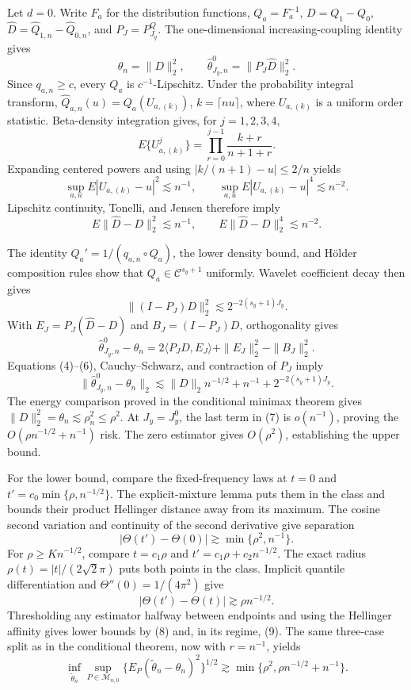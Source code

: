 Let \(d=0\).  Write \(F_a\) for the distribution functions, \(Q_a=F_a^{-1}\), \(D=Q_1-Q_0\), \(\widehat D=\widehat Q_{1,n}-\widehat Q_{0,n}\), and \(P_J=P^Q_{J_y}\).  The one-dimensional increasing-coupling identity gives
\[
\theta_n=\|D\|_2^2,
\qquad
\widehat\theta^0_{J_y,n}=\|P_J\widehat D\|_2^2. \tag{1}
\]
Since \(q_{a,n}\ge c\), every \(Q_a\) is \(c^{-1}\)-Lipschitz.  Under the probability integral transform, \(\widehat Q_{a,n}(u)=Q_a(U_{a,(k)})\), \(k=\lceil nu\rceil\), where \(U_{a,(k)}\) is a uniform order statistic.  Beta-density integration gives, for \(j=1,2,3,4\),
\[
E\{U_{a,(k)}^j\}=\prod_{r=0}^{j-1}\frac{k+r}{n+1+r}. \tag{2}
\]
Expanding centered powers and using \(|k/(n+1)-u|\le2/n\) yields
\[
\sup_{a,u}E|U_{a,(k)}-u|^2\lesssim n^{-1},
\qquad
\sup_{a,u}E|U_{a,(k)}-u|^4\lesssim n^{-2}. \tag{3}
\]
Lipschitz continuity, Tonelli, and Jensen therefore imply
\[
E\|\widehat D-D\|_2^2\lesssim n^{-1},
\qquad E\|\widehat D-D\|_2^4\lesssim n^{-2}. \tag{4}
\]

The identity \(Q_a'=1/(q_{a,n}\circ Q_a)\), the lower density bound, and H\"older composition rules show that \(Q_a\in\mathcal C^{s_y+1}\) uniformly.  Wavelet coefficient decay then gives
\[
\|(I-P_J)D\|_2^2\lesssim2^{-2(s_y+1)J_y}. \tag{5}
\]
With \(E_J=P_J(\widehat D-D)\) and \(B_J=(I-P_J)D\), orthogonality gives
\[
\widehat\theta^0_{J_y,n}-\theta_n
=2\langle P_JD,E_J\rangle+\|E_J\|_2^2-\|B_J\|_2^2. \tag{6}
\]
Equations (4)--(6), Cauchy--Schwarz, and contraction of \(P_J\) imply
\[
\|\widehat\theta^0_{J_y,n}-\theta_n\|_2
\lesssim\|D\|_2n^{-1/2}+n^{-1}+2^{-2(s_y+1)J_y}. \tag{7}
\]
The energy comparison proved in the conditional minimax theorem gives \(\|D\|_2^2=\theta_n\lesssim\rho_n^2\le\rho^2\).  At \(J_y=J_y^0\), the last term in (7) is \(o(n^{-1})\), proving the \(O(\rho n^{-1/2}+n^{-1})\) risk.  The zero estimator gives \(O(\rho^2)\), establishing the upper bound.

For the lower bound, compare the fixed-frequency laws at \(t=0\) and \(t'=c_0\min\{\rho,n^{-1/2}\}\).  The explicit-mixture lemma puts them in the class and bounds their product Hellinger distance away from its maximum.  The cosine second variation and continuity of the second derivative give separation
\[
|\Theta(t')-\Theta(0)|\gtrsim\min\{\rho^2,n^{-1}\}. \tag{8}
\]
For \(\rho\ge Kn^{-1/2}\), compare \(t=c_1\rho\) and \(t'=c_1\rho+c_2n^{-1/2}\).  The exact radius \(\rho(t)=|t|/(2\sqrt2\pi)\) puts both points in the class.  Implicit quantile differentiation and \(\Theta''(0)=1/(4\pi^2)\) give
\[
|\Theta(t')-\Theta(t)|\gtrsim\rho n^{-1/2}. \tag{9}
\]
Thresholding any estimator halfway between endpoints and using the Hellinger affinity gives lower bounds by (8) and, in its regime, (9).  The same three-case split as in the conditional theorem, now with \(r=n^{-1}\), yields
\[
\inf_{\widetilde\theta_n}\sup_{P\in\mathcal M_{n,0}}
\{E_P(\widetilde\theta_n-\theta_n)^2\}^{1/2}
\gtrsim\min\{\rho^2,\rho n^{-1/2}+n^{-1}\}. \tag{10}
\]

